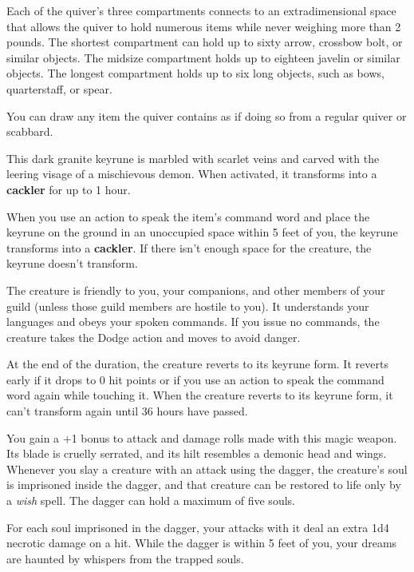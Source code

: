 \documentclass[10pt,a4paper,twoside,bg=print,twocolumn,openany,nodeprecatedcode]{dndbook}
\begin{document}
Each of the quiver's three compartments connects to an extradimensional space that allows the quiver to hold numerous items while never weighing more than 2 pounds. The shortest compartment can hold up to sixty arrow, crossbow bolt, or similar objects. The midsize compartment holds up to eighteen javelin or similar objects. The longest compartment holds up to six long objects, such as bows, quarterstaff, or spear.

You can draw any item the quiver contains as if doing so from a regular quiver or scabbard.

This dark granite keyrune is marbled with scarlet veins and carved with the leering visage of a mischievous demon. When activated, it transforms into a \textbf{cackler} for up to 1 hour.

When you use an action to speak the item's command word and place the keyrune on the ground in an unoccupied space within 5 feet of you, the keyrune transforms into a \textbf{cackler}. If there isn't enough space for the creature, the keyrune doesn't transform.

The creature is friendly to you, your companions, and other members of your guild (unless those guild members are hostile to you). It understands your languages and obeys your spoken commands. If you issue no commands, the creature takes the Dodge action and moves to avoid danger.

At the end of the duration, the creature reverts to its keyrune form. It reverts early if it drops to 0 hit points or if you use an action to speak the command word again while touching it. When the creature reverts to its keyrune form, it can't transform again until 36 hours have passed.

You gain a +1 bonus to attack and damage rolls made with this magic weapon. Its blade is cruelly serrated, and its hilt resembles a demonic head and wings. Whenever you slay a creature with an attack using the dagger, the creature's soul is imprisoned inside the dagger, and that creature can be restored to life only by a \textit{wish} spell. The dagger can hold a maximum of five souls.

For each soul imprisoned in the dagger, your attacks with it deal an extra 1d4 necrotic damage on a hit. While the dagger is within 5 feet of you, your dreams are haunted by whispers from the trapped souls.
\end{document}
